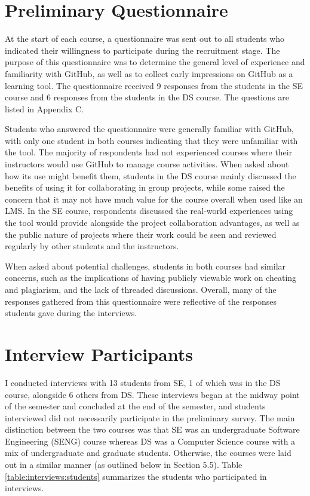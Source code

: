 
\section{Preliminary Questionnaire}
At the start of each course, a questionnaire was sent out to all students who indicated their willingness to participate during the recruitment stage. The purpose of this questionnaire was to determine the general level of experience and familiarity with GitHub, as well as to collect early impressions on GitHub as a learning tool. The questionnaire received 9 responses from the students in the SE course and 6 responses from the students in the DS course. The questions are listed in Appendix C.

Students who answered the questionnaire were generally familiar with GitHub, with only one student in both courses indicating that they were unfamiliar with the tool. The majority of respondents had not experienced courses where their instructors would use GitHub to manage course activities. When asked about how its use might benefit them, students in the DS course mainly discussed the benefits of using it for collaborating in group projects, while some raised the concern that it may not have much value for the course overall when used like an LMS. In the SE course, respondents discussed the real-world experiences using the tool would provide alongside the project collaboration advantages, as well as the public nature of projects where their work could be seen and reviewed regularly by other students and the instructors.

When asked about potential challenges, students in both courses had similar concerns, such as the implications of having publicly viewable work on cheating and plagiarism, and the lack of threaded discussions. Overall, many of the responses gathered from this questionnaire were reflective of the responses students gave during the interviews.

\section{Interview Participants}
I conducted interviews with 13 students from SE, 1 of which was in the DS course, alongside 6 others from DS. These interviews began at the midway point of the semester and concluded at the end of the semester, and students interviewed did not necessarily participate in the preliminary survey. The main distinction between the two courses was that SE was an undergraduate Software Engineering (SENG) course whereas DS was a Computer Science course with a mix of undergraduate and graduate students. Otherwise, the courses were laid out in a similar manner (as outlined below in Section 5.5). Table \ref{table:interviews:students} summarizes the students who participated in interviews.

